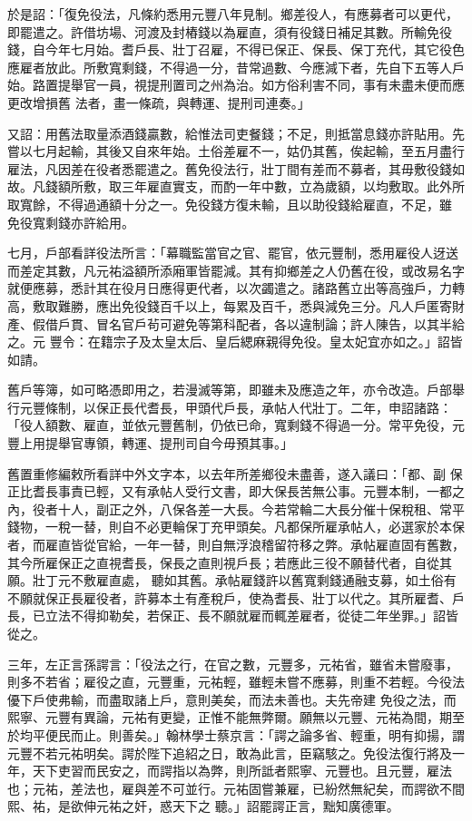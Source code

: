 \begin{pinyinscope}
 於是詔：「復免役法，凡條約悉用元豐八年見制。鄉差役人，有應募者可以更代，即罷遣之。許借坊場、河渡及封樁錢以為雇直，須有役錢日補足其數。所輸免役錢，自今年七月始。耆戶長、壯丁召雇，不得已保正、保長、保丁充代，其它役色應雇者放此。所敷寬剩錢，不得過一分，昔常過數、今應減下者，先自下五等人戶始。路置提舉官一員，視提刑置司之州為治。如方俗利害不同，事有未盡未便而應更改增損舊
 法者，畫一條疏，與轉運、提刑司連奏。」



 又詔：用舊法取量添酒錢贏數，給惟法司吏餐錢；不足，則抵當息錢亦許貼用。先嘗以七月起輸，其後又自來年始。土俗差雇不一，姑仍其舊，俟起輸，至五月盡行雇法，凡因差在役者悉罷遣之。舊免役法行，壯丁間有差而不募者，其毋敷役錢如故。凡錢額所敷，取三年雇直實支，而酌一年中數，立為歲額，以均敷取。此外所取寬餘，不得過通額十分之一。免役錢方復未輸，且以助役錢給雇直，不足，雖
 免役寬剩錢亦許給用。



 七月，戶部看詳役法所言：「幕職監當官之官、罷官，依元豐制，悉用雇役人迓送而差定其數，凡元祐溢額所添廂軍皆罷減。其有抑鄉差之人仍舊在役，或改易名字就便應募，悉計其在役月日應得更代者，以次蠲遣之。諸路舊立出等高強戶，力轉高，敷取難勝，應出免役錢百千以上，每累及百千，悉與減免三分。凡人戶匿寄財產、假借戶貫、冒名官戶茍可避免等第科配者，各以違制論；許人陳告，以其半給之。元
 豐令：在籍宗子及太皇太后、皇后緦麻親得免役。皇太妃宜亦如之。」詔皆如請。



 舊戶等簿，如可略憑即用之，若漫滅等第，即雖未及應造之年，亦令改造。戶部舉行元豐條制，以保正長代耆長，甲頭代戶長，承帖人代壯丁。二年，申詔諸路：「役人額數、雇直，並依元豐舊制，仍依已命，寬剩錢不得過一分。常平免役，元豐上用提舉官專領，轉運、提刑司自今毋預其事。」



 舊置重修編敕所看詳中外文字本，以去年所差鄉役未盡善，遂入議曰：「都、副
 保正比耆長事責已輕，又有承帖人受行文書，即大保長苦無公事。元豐本制，一都之內，役者十人，副正之外，八保各差一大長。今若常輪二大長分催十保稅租、常平錢物，一稅一替，則自不必更輪保丁充甲頭矣。凡都保所雇承帖人，必選家於本保者，而雇直皆從官給，一年一替，則自無浮浪稽留符移之弊。承帖雇直固有舊數，其今所雇保正之直視耆長，保長之直則視戶長；若應此三役不願替代者，自從其願。壯丁元不敷雇直處，
 聽如其舊。承帖雇錢許以舊寬剩錢通融支募，如土俗有不願就保正長雇役者，許募本土有產稅戶，使為耆長、壯丁以代之。其所雇耆、戶長，已立法不得抑勒矣，若保正、長不願就雇而輒差雇者，從徒二年坐罪。」詔皆從之。



 三年，左正言孫諤言：「役法之行，在官之數，元豐多，元祐省，雖省未嘗廢事，則多不若省；雇役之直，元豐重，元祐輕，雖輕未嘗不應募，則重不若輕。今役法優下戶使弗輸，而盡取諸上戶，意則美矣，而法未善也。夫先帝建
 免役之法，而熙寧、元豐有異論，元祐有更變，正惟不能無弊爾。願無以元豐、元祐為間，期至於均平便民而止。則善矣。」翰林學士蔡京言：「諤之論多省、輕重，明有抑揚，謂元豐不若元祐明矣。諤於陛下追紹之日，敢為此言，臣竊駭之。免役法復行將及一年，天下吏習而民安之，而諤指以為弊，則所詆者熙寧、元豐也。且元豐，雇法也；元祐，差法也，雇與差不可並行。元祐固嘗兼雇，已紛然無紀矣，而諤欲不間熙、祐，是欲伸元祐之奸，惑天下之
 聽。」詔罷諤正言，黜知廣德軍。




\end{pinyinscope}
